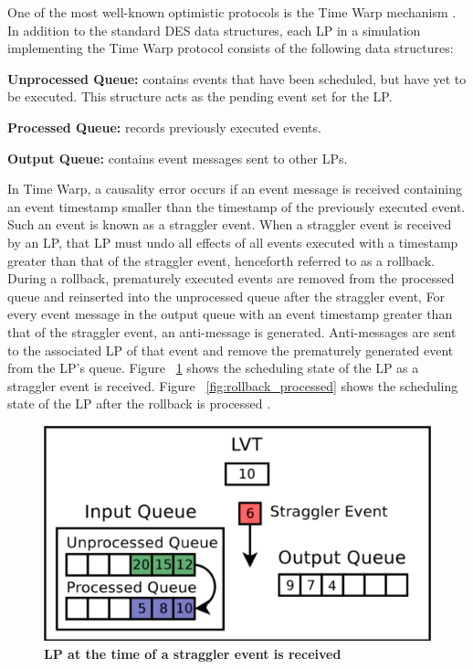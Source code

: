 \documentclass[a4paper]{article}
\begin{document}
One of the most well-known optimistic protocols is the Time Warp mechanism
\cite{fujimoto}.  In addition to the standard DES data structures, each LP in a
simulation implementing the Time Warp protocol consists of the following data
structures:\par 
\textbf{Unprocessed Queue:} contains events that have been scheduled, but have
yet to be executed.  This structure acts as the pending event set for the
LP.\par 
\textbf{Processed Queue:} records previously executed events.\par
\textbf{Output Queue:} contains event messages sent to other LPs.\par

In Time Warp, a causality error occurs if an event message is
received containing an event timestamp smaller than the timestamp of the
previously executed event.  Such an event is known as a straggler event.  When a
straggler event is received by an LP, that LP must undo all effects of all
events executed with a timestamp greater than that of the straggler event,
henceforth referred to as a rollback.  During a rollback, prematurely executed
events are removed from the processed queue and reinserted into the unprocessed
queue after the straggler event,  For every event message in the output queue
with an event timestamp greater than that of the straggler event, an
anti-message is generated.  Anti-messages are sent to the associated LP of that
event and remove the prematurely generated event from the LP's queue.  Figure
~\ref{fig:rollback_stragglerrecvd} shows the scheduling state of the LP as a
straggler event is received.  Figure ~\ref{fig:rollback_processed} shows the
scheduling state of the LP after the rollback is processed \cite{dickman}.

\begin{figure}[H]
    \centering
    \graphicspath{ {./figures/} }
    \includegraphics[width=\textwidth,height=\textheight,keepaspectratio]{rollback_recv}
    \caption{\textbf{LP at the time of a straggler event is received}}
    \label{fig:rollback_stragglerrecvd}
\end{figure}
\end{document}
